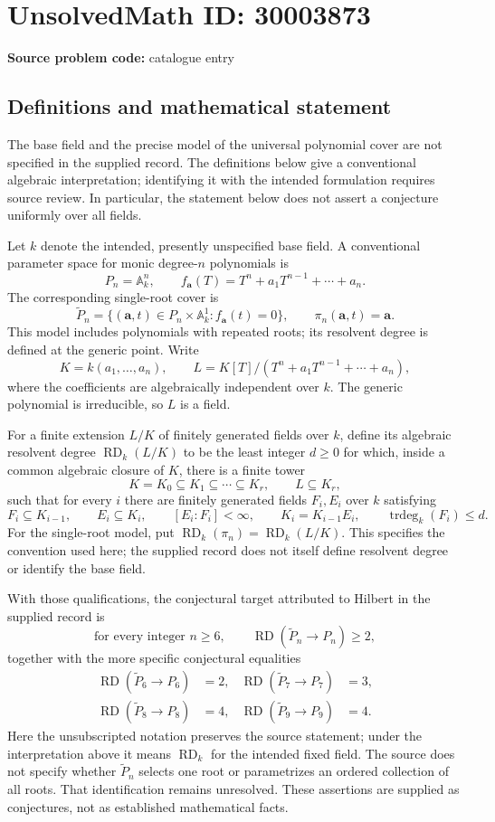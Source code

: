 \documentclass[11pt]{article}
\begin{document}
\section*{UnsolvedMath ID: 30003873}
\textbf{Source problem code:} catalogue entry
\subsection{Definitions and mathematical statement}
The base field and the precise model of the universal polynomial cover are not specified in the supplied record. The definitions below give a conventional algebraic interpretation; identifying it with the intended formulation requires source review. In particular, the statement below does not assert a conjecture uniformly over all fields.

Let \(k\) denote the intended, presently unspecified base field. A conventional parameter space for monic degree-\(n\) polynomials is
\[
P_n=\mathbb A_k^n,\qquad f_{\mathbf a}(T)=T^n+a_1T^{n-1}+\cdots+a_n.
\]
The corresponding single-root cover is
\[
\widetilde P_n=\{(\mathbf a,t)\in P_n\times\mathbb A_k^1:f_{\mathbf a}(t)=0\},\qquad
\pi_n(\mathbf a,t)=\mathbf a.
\]
This model includes polynomials with repeated roots; its resolvent degree is defined at the generic point. Write
\[
K=k(a_1,\ldots,a_n),\qquad L=K[T]/(T^n+a_1T^{n-1}+\cdots+a_n),
\]
where the coefficients are algebraically independent over \(k\). The generic polynomial is irreducible, so \(L\) is a field.

For a finite extension \(L/K\) of finitely generated fields over \(k\), define its algebraic resolvent degree \(\operatorname{RD}_k(L/K)\) to be the least integer \(d\geq0\) for which, inside a common algebraic closure of \(K\), there is a finite tower
\[
K=K_0\subseteq K_1\subseteq\cdots\subseteq K_r,\qquad L\subseteq K_r,
\]
such that for every \(i\) there are finitely generated fields \(F_i,E_i\) over \(k\) satisfying
\[
F_i\subseteq K_{i-1},\qquad E_i\subseteq K_i,\qquad
[E_i:F_i]<\infty,\qquad K_i=K_{i-1}E_i,\qquad
\operatorname{trdeg}_k(F_i)\leq d.
\]
For the single-root model, put \(\operatorname{RD}_k(\pi_n)=\operatorname{RD}_k(L/K)\). This specifies the convention used here; the supplied record does not itself define resolvent degree or identify the base field.

With those qualifications, the conjectural target attributed to Hilbert in the supplied record is
\[
\text{for every integer }n\geq6,\qquad
\operatorname{RD}(\widetilde P_n\to P_n)\geq2,
\]
together with the more specific conjectural equalities
\[
\begin{aligned}
\operatorname{RD}(\widetilde P_6\to P_6)&=2,&
\operatorname{RD}(\widetilde P_7\to P_7)&=3,\\
\operatorname{RD}(\widetilde P_8\to P_8)&=4,&
\operatorname{RD}(\widetilde P_9\to P_9)&=4.
\end{aligned}
\]
Here the unsubscripted notation preserves the source statement; under the interpretation above it means \(\operatorname{RD}_k\) for the intended fixed field. The source does not specify whether \(\widetilde P_n\) selects one root or parametrizes an ordered collection of all roots. That identification remains unresolved. These assertions are supplied as conjectures, not as established mathematical facts.
\end{document}
